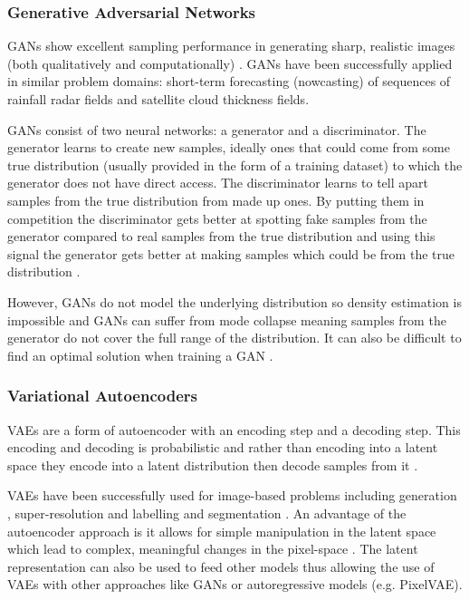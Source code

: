\subsubsection{Generative Adversarial Networks}

GANs show excellent sampling performance in generating sharp, realistic images (both qualitatively and computationally) \cite{karras2018progressive}. GANs \cite{Leinonen2020GANsd,ravuri2021deepgenprecip} have been successfully applied in similar problem domains: short-term forecasting (nowcasting) of sequences of rainfall radar fields and satellite cloud thickness fields.

GANs consist of two neural networks: a generator and a discriminator. The generator learns to create new samples, ideally ones that could come from some true distribution (usually provided in the form of a training dataset) to which the generator does not have direct access. The discriminator learns to tell apart samples from the true distribution from made up ones. By putting them in competition the discriminator gets better at spotting fake samples from the generator compared to real samples from the true distribution and using this signal the generator gets better at making samples which could be from the true distribution \cite{creswell2018ganreview}.

However, GANs do not model the underlying distribution so density estimation is impossible and GANs can suffer from mode collapse \cite{grover2018flowgan} meaning samples from the generator do not cover the full range of the distribution. It can also be difficult to find an optimal solution when training a GAN \cite{creswell2018ganreview}.

\subsubsection{Variational Autoencoders}

VAEs are a form of autoencoder with an encoding step and a decoding step. This encoding and decoding is probabilistic and rather than encoding into a latent space they encode into a latent distribution then decode samples from it \cite{kingma2019vaereview,kingma2014vaeorigin}.

VAEs have been successfully used for image-based problems including generation \cite{gregor2016vaeimagedrawcompression}, super-resolution \cite{liu2021srvae} and labelling and segmentation \cite{sohn2015conditionalvae}. An advantage of the autoencoder approach is it allows for simple manipulation in the latent space which lead to complex, meaningful changes in the pixel-space \cite{kulkarni2015dcign, white2016vaelatentmanip}. The latent representation can also be used to feed other models thus allowing the use of VAEs with other approaches like GANs \cite{larsen2016vaegan} or autoregressive models (e.g. PixelVAE\cite{gulrajani2017pixelvae}).

